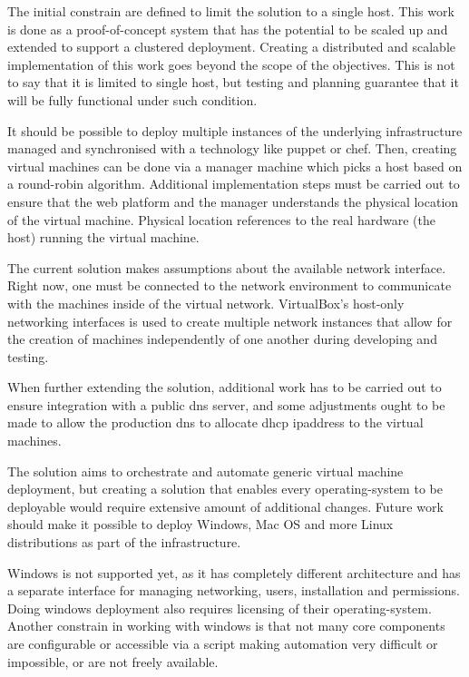 \documentclass{article}
\begin{document}
The initial constrain are defined to limit the solution to a single host. This work is done as a proof-of-concept system that has the potential to be scaled up and extended to support a clustered deployment.
Creating a distributed and scalable implementation of this work goes beyond the scope of the objectives. This is not to say that it is limited to single host, but testing and planning guarantee that it will be fully functional under such condition.

It should be possible to deploy multiple instances of the underlying infrastructure managed and synchronised with a technology like puppet or chef. Then, creating virtual machines can be done via a manager machine which picks a host based on a round-robin algorithm. Additional implementation steps must be carried out to ensure that the web platform and the manager understands the physical location of the virtual machine. Physical location references to the real hardware (the host) running the virtual machine.

The current solution makes assumptions about the available network interface. Right now, one must be connected to the network environment to communicate with the machines inside of the virtual network. VirtualBox's host-only networking interfaces is used to create multiple network instances that allow for the creation of machines independently of one another during developing and testing.

When further extending the solution, additional work has to be carried out to ensure integration with a public \gls{dns} server, and some adjustments ought to be made to allow the production \gls{dns} to allocate \gls{dhcp} \gls{ipaddress} to the virtual machines.

The solution aims to orchestrate and automate generic virtual machine deployment, but creating a solution that enables every \gls{operating-system} to be deployable would require extensive amount of additional changes. Future work should make it possible to deploy Windows, Mac OS and more Linux distributions as part of the infrastructure.

Windows is not supported yet, as it has completely different architecture and has a separate interface for managing networking, users, installation and permissions. Doing windows deployment also requires licensing of their \gls{operating-system}. Another constrain in working with windows is that not many core components are configurable or accessible via a script making automation very difficult or impossible, or are not freely available.
\end{document}
